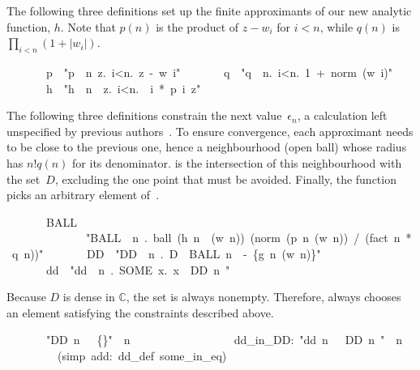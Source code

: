 \documentclass[runningheads]{llncs}
\begin{document}
The following three definitions set up the finite approximants of our new analytic function, $h$.
Note that $p(n)$ is the product of $z - w_i$ for $i<n$, while $q(n)$ is $\prod_{i<n} (1 + |w_i|)$.

\begin{isabelle}
\ \ \ \ \ \ \ p\ \ "p\ \isasymequiv \ \isasymlambda n\ z.\ \isasymProd i<n.\ z\ -\ w\ i"\isanewline
\ \ \ \ \ \ \ q\ \ "q\ \isasymequiv \ \isasymlambda n.\ \isasymProd i<n.\ 1\ +\ norm\ (w\ i)"\isanewline
\ \ \ \ \ \ \ h\ \ "h\ \isasymequiv \ \isasymlambda n\ \isasymepsilon \ z.\ \isasymSum i<n.\ \isasymepsilon \ i\ *\ p\ i\ z"
\end{isabelle}

The following three definitions constrain the next value~$\epsilon_n$, a calculation left unspecified by previous authors~\cite{aigner-proofs,erdos-interpolation}. To ensure convergence, each approximant needs to be close to the previous one, hence a neighbourhood (open ball) whose radius has $n!q(n)$ for its denominator.  is the intersection of this neighbourhood with the set~$D$, excluding the one point that must be avoided. Finally, the function  picks an arbitrary element of~\@.

\begin{isabelle}
\ \ \ \ \ \ \ BALL\ \isanewline
\ \ \ \ \ \ \ \ \ \ \ \ \ \ "BALL\ \isasymequiv \ \isasymlambda n\ \isasymepsilon .\ ball\ (h\ n\ \isasymepsilon \ (w\ n))\ (norm\ (p\ n\ (w\ n))\ /\ (fact\ n\ *\ q\ n))"\isanewline
\ \ \ \ \ \ \ DD\ \ "DD\ \isasymequiv \ \isasymlambda n\ \isasymepsilon .\ D\ \isasyminter \ BALL\ n\ \isasymepsilon \ -\ \{g\ n\ (w\ n)\}"\isanewline
\ \ \ \ \ \ \ dd\ \ "dd\ \isasymequiv \ \isasymlambda n\ \isasymepsilon .\ SOME\ x.\ x\ \isasymin \ DD\ n\ \isasymepsilon"
\end{isabelle}
%
Because $D$ is dense in $\mathbb{C}$, the set  is always nonempty. Therefore,  always chooses an element satisfying the constraints described above.

\begin{isabelle}
\ \ \ \ \ \ \ "DD\ n\ \isasymepsilon \ \isasymnoteq \ \{\}"\ \ n\ \isasymepsilon \isanewline
\ \ \ \ \ \ \ \ \prf\isanewline
\ \ \ \ \ \ \ \ dd\_in\_DD:\ "dd\ n\ \isasymepsilon \ \isasymin \ DD\ n\ \isasymepsilon "\ \ n\ \isasymepsilon \isanewline
\ \ \ \ \ \ \ \ \ (simp\ add:\ dd\_def\ some\_in\_eq)
\end{isabelle}
\end{document}

